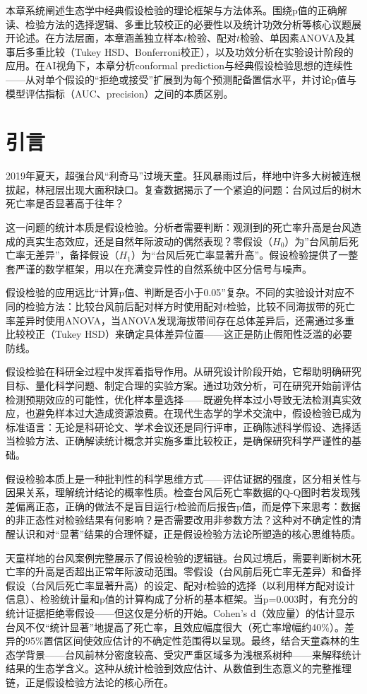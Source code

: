 \documentclass[
  twoside,12pt,fontset=none]{ctexbook}
\begin{document}
本章系统阐述生态学中经典假设检验的理论框架与方法体系。围绕p值的正确解读、检验方法的选择逻辑、多重比较校正的必要性以及统计功效分析等核心议题展开论述。在方法层面，本章涵盖独立样本\(t\)检验、配对\(t\)检验、单因素ANOVA及其事后多重比较（Tukey HSD、Bonferroni校正），以及功效分析在实验设计阶段的应用。在AI视角下，本章分析conformal prediction与经典假设检验思想的连续性------从对单个假设的``拒绝或接受''扩展到为每个预测配备置信水平，并讨论p值与模型评估指标（AUC、precision）之间的本质区别。

\hypertarget{ux5f15ux8a00-4}{%
\section{引言}\label{ux5f15ux8a00-4}}

2019年夏天，超强台风``利奇马''过境天童。狂风暴雨过后，样地中许多大树被连根拔起，林冠层出现大面积缺口。复查数据揭示了一个紧迫的问题：台风过后的树木死亡率是否显著高于往年？

这一问题的统计本质是假设检验。分析者需要判断：观测到的死亡率升高是台风造成的真实生态效应，还是自然年际波动的偶然表现？零假设（\(H_0\)）为''台风前后死亡率无差异''，备择假设（\(H_1\)）为``台风后死亡率显著升高''。假设检验提供了一整套严谨的数学框架，用以在充满变异性的自然系统中区分信号与噪声。

假设检验的应用远比``计算p值、判断是否小于0.05''复杂。不同的实验设计对应不同的检验方法：比较台风前后配对样方时使用配对\(t\)检验，比较不同海拔带的死亡率差异时使用ANOVA，当ANOVA发现海拔带间存在总体差异后，还需通过多重比较校正（Tukey HSD）来确定具体差异位置------这正是防止假阳性泛滥的必要防线。

假设检验在科研全过程中发挥着指导作用。从研究设计阶段开始，它帮助明确研究目标、量化科学问题、制定合理的实验方案。通过功效分析，可在研究开始前评估检测预期效应的可能性，优化样本量选择------既避免样本过小导致无法检测真实效应，也避免样本过大造成资源浪费。在现代生态学的学术交流中，假设检验已成为标准语言：无论是科研论文、学术会议还是同行评审，正确陈述科学假设、选择适当检验方法、正确解读统计概念并实施多重比较校正，是确保研究科学严谨性的基础。

假设检验本质上是一种批判性的科学思维方式------评估证据的强度，区分相关性与因果关系，理解统计结论的概率性质。检查台风后死亡率数据的Q-Q图时若发现残差偏离正态，正确的做法不是盲目运行\(t\)检验而后报告p值，而是停下来思考：数据的非正态性对检验结果有何影响？是否需要改用非参数方法？这种对不确定性的清醒认识和对``显著''结果的合理怀疑，正是假设检验方法论所塑造的核心思维特质。

天童样地的台风案例完整展示了假设检验的逻辑链。台风过境后，需要判断树木死亡率的升高是否超出正常年际波动范围。零假设（台风前后死亡率无差异）和备择假设（台风后死亡率显著升高）的设定、配对\(t\)检验的选择（以利用样方配对设计信息）、检验统计量和p值的计算构成了分析的基本框架。当p=0.003时，有充分的统计证据拒绝零假设------但这仅是分析的开始。Cohen's d（效应量）的估计显示台风不仅``统计显著''地提高了死亡率，且效应幅度很大（死亡率增幅约40\%）。差异的95\%置信区间使效应估计的不确定性范围得以呈现。最终，结合天童森林的生态学背景------台风前林分密度较高、受灾严重区域多为浅根系树种------来解释统计结果的生态学含义。这种从统计检验到效应估计、从数值到生态意义的完整推理链，正是假设检验方法论的核心所在。
\end{document}
